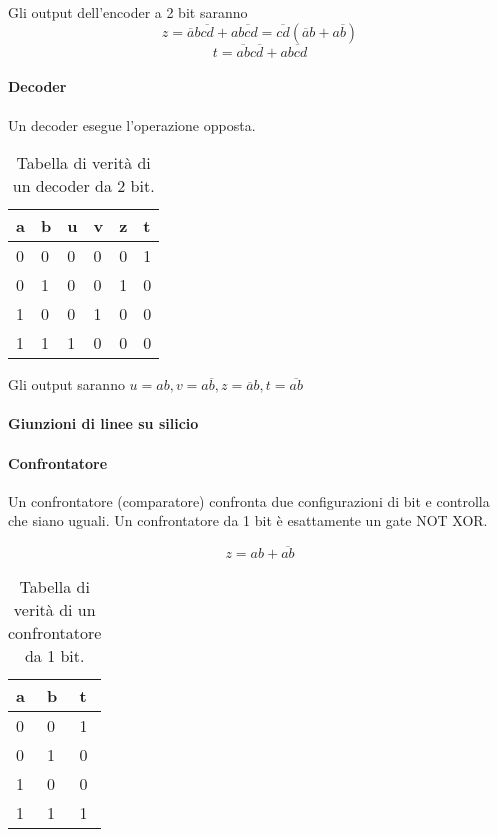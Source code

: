 
Gli output dell'encoder a 2 bit saranno
\[ z = \overbar{a}b\overbar{cd}+a\overbar{bcd} = \overbar{cd}(\overbar{a}b+a\overbar{b}) \]
\[ t = \overbar{ab}c\overbar{d}+a\overbar{bcd} \]


\paragraph{Decoder}
Un decoder esegue l'operazione opposta.

\begin{table}[H]
	\centering
	\caption{Tabella di verità di un decoder da 2 bit.}
	\label{tab:2bitdecoder}
	\begin{tabular}{|ll|llll|}
		\hline
		a & b & u & v & z & t \\ \hline
		0 & 0 & 0 & 0 & 0 & 1 \\
		0 & 1 & 0 & 0 & 1 & 0 \\
		1 & 0 & 0 & 1 & 0 & 0 \\
		1 & 1 & 1 & 0 & 0 & 0 \\ \hline
	\end{tabular}
\end{table}

Gli output saranno $ u = ab, v = a\overbar{b}, z = \overbar{a}b, t = \overbar{ab} $


\paragraph{Giunzioni di linee su silicio}


\paragraph{Confrontatore}
Un confrontatore (comparatore) confronta due configurazioni di bit e controlla che siano uguali. Un confrontatore da 1 bit è esattamente un gate NOT XOR.

\[ z = ab + \overbar{ab} \]

\begin{table}[H]
	\centering
	\caption{Tabella di verità di un confrontatore da 1 bit.}
	\label{tab:2bitcomparator}
	\begin{tabular}{|ll|l|}
		\hline
		a & b & t \\ \hline
		0 & 0 & 1 \\
		0 & 1 & 0 \\
		1 & 0 & 0 \\
		1 & 1 & 1 \\ \hline
	\end{tabular}
\end{table}

